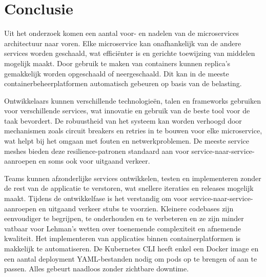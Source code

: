 
\chapter{Conclusie}%
\label{ch:conclusie}

Uit het onderzoek komen een aantal voor- en nadelen van de microservices architectuur naar voren. Elke microservice kan onafhankelijk van de andere services worden geschaald, wat efficiënter is en gerichte toewijzing van middelen mogelijk maakt. Door gebruik te maken van containers kunnen replica’s gemakkelijk worden opgeschaald of neergeschaald. Dit kan in de meeste containerbeheerplatformen automatisch gebeuren op basis van de belasting.

Ontwikkelaars kunnen verschillende technologieën, talen en frameworks gebruiken voor verschillende services, wat innovatie en gebruik van de beste tool voor de taak bevordert. De robuustheid van het systeem kan worden verhoogd door mechanismen zoals circuit breakers en retries in te bouwen voor elke microservice, wat helpt bij het omgaan met fouten en netwerkproblemen. De meeste service meshes bieden deze resilience-patronen standaard aan voor service-naar-service-aanroepen en soms ook voor uitgaand verkeer.

Teams kunnen afzonderlijke services ontwikkelen, testen en implementeren zonder de rest van de applicatie te verstoren, wat snellere iteraties en releases mogelijk maakt. Tijdens de ontwikkelfase is het verstandig om voor service-naar-service-aanroepen en uitgaand verkeer stubs te voorzien. Kleinere codebases zijn eenvoudiger te begrijpen, te onderhouden en te verbeteren en ze zijn minder vatbaar voor Lehman's wetten over toenemende complexiteit en afnemende kwaliteit. Het implementeren van applicaties binnen containerplatformen is makkelijk te automatiseren. De Kubernetes CLI heeft enkel een Docker image en een aantal deployment YAML-bestanden nodig om pods op te brengen of aan te passen. Alles gebeurt naadloos zonder zichtbare downtime.

